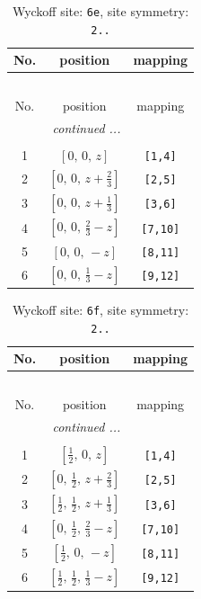 \documentclass[fleqn,8pt]{jsarticle}
\begin{document}
\begin{longtable}{ccc}
\caption{Wyckoff site: {\tt 6e}, site symmetry: {\tt 2..}}
 \\
 \hline \hline
No. & position & mapping \\ \hline \endfirsthead

\multicolumn{2}{l}{\tablename\ \thetable{}} \\
 \hline \hline
No. & position & mapping \\ \hline \endhead

 \hline \hline
\multicolumn{2}{r}{\footnotesize\it continued ...} \\ \endfoot

 \hline \hline
\multicolumn{2}{r}{} \\ \endlastfoot

1 & $\left[ 0,\, 0,\, z \right]$ & {\tt [1,4]} \\ \hline
2 & $\left[ 0,\, 0,\, z + \frac{2}{3} \right]$ & {\tt [2,5]} \\ \hline
3 & $\left[ 0,\, 0,\, z + \frac{1}{3} \right]$ & {\tt [3,6]} \\ \hline
4 & $\left[ 0,\, 0,\, \frac{2}{3} - z \right]$ & {\tt [7,10]} \\ \hline
5 & $\left[ 0,\, 0,\, - z \right]$ & {\tt [8,11]} \\ \hline
6 & $\left[ 0,\, 0,\, \frac{1}{3} - z \right]$ & {\tt [9,12]} \\
\end{longtable}
\renewcommand{\arraystretch}{1.2}
\begin{longtable}{ccc}
\caption{Wyckoff site: {\tt 6f}, site symmetry: {\tt 2..}}
 \\
 \hline \hline
No. & position & mapping \\ \hline \endfirsthead

\multicolumn{2}{l}{\tablename\ \thetable{}} \\
 \hline \hline
No. & position & mapping \\ \hline \endhead

 \hline \hline
\multicolumn{2}{r}{\footnotesize\it continued ...} \\ \endfoot

 \hline \hline
\multicolumn{2}{r}{} \\ \endlastfoot

1 & $\left[ \frac{1}{2},\, 0,\, z \right]$ & {\tt [1,4]} \\ \hline
2 & $\left[ 0,\, \frac{1}{2},\, z + \frac{2}{3} \right]$ & {\tt [2,5]} \\ \hline
3 & $\left[ \frac{1}{2},\, \frac{1}{2},\, z + \frac{1}{3} \right]$ & {\tt [3,6]} \\ \hline
4 & $\left[ 0,\, \frac{1}{2},\, \frac{2}{3} - z \right]$ & {\tt [7,10]} \\ \hline
5 & $\left[ \frac{1}{2},\, 0,\, - z \right]$ & {\tt [8,11]} \\ \hline
6 & $\left[ \frac{1}{2},\, \frac{1}{2},\, \frac{1}{3} - z \right]$ & {\tt [9,12]} \\
\end{longtable}
\end{document}
